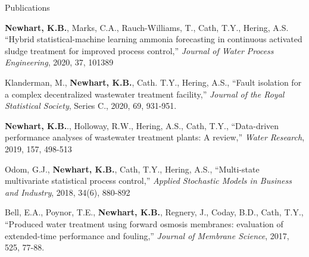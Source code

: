 \documentclass{resume} %
\begin{document}
\begin{rSection}{Publications}
\begin{etaremune}
	\item \textbf{Newhart, K.B.}, Marks, C.A., Rauch-Williams, T., Cath, T.Y., Hering, A.S. ``Hybrid statistical-machine learning ammonia forecasting in continuous activated sludge treatment for improved process control,'' \emph{Journal of Water Process Engineering}, 2020, 37, 101389

	\item Klanderman, M., \textbf{Newhart, K.B.}, Cath. T.Y., Hering, A.S., ``Fault isolation for a complex decentralized wastewater treatment facility,'' \emph{Journal of the Royal Statistical Society}, Series C., 2020, 69, 931-951.

	\item \textbf{Newhart, K.B.}., Holloway, R.W., Hering, A.S., Cath, T.Y., ``Data-driven performance analyses of wastewater treatment plants: A review,'' \emph{Water Research}, 2019, 157, 498-513

	\item Odom, G.J., \textbf{Newhart, K.B.}, Cath, T.Y., Hering, A.S., ``Multi-state multivariate statistical process control,'' \emph{Applied Stochastic Models in Business and Industry}, 2018, 34(6), 880-892

	\item Bell, E.A., Poynor, T.E., \textbf{Newhart, K.B.}, Regnery, J., Coday, B.D., Cath, T.Y., ``Produced water treatment using forward osmosis membranes: evaluation of extended-time performance and fouling,'' \emph{Journal of Membrane Science}, 2017, 525, 77-88.
\end{etaremune}

\end{rSection}


\end{document}
